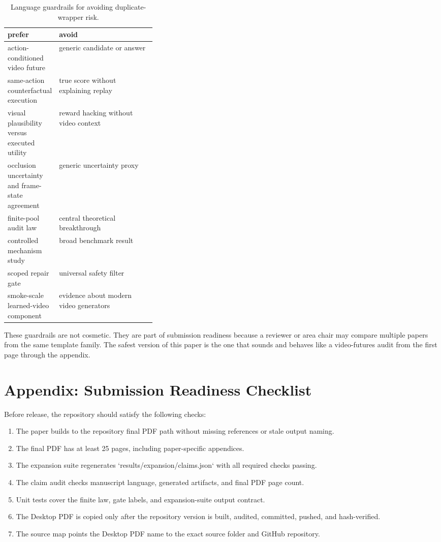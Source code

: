 \documentclass{article}
\begin{document}
\begin{table}[tbp]
  \centering
  \small
  \caption{Language guardrails for avoiding duplicate-wrapper risk.}
  \label{tab:language-guardrails}
  \begin{tabularx}{\linewidth}{@{}p{0.34\linewidth}X@{}}
    \toprule
    prefer & avoid \\
    \midrule
    action-conditioned video future & generic candidate or answer \\
    same-action counterfactual execution & true score without explaining replay \\
    visual plausibility versus executed utility & reward hacking without video context \\
    occlusion uncertainty and frame-state agreement & generic uncertainty proxy \\
    finite-pool audit law & central theoretical breakthrough \\
    controlled mechanism study & broad benchmark result \\
    scoped repair gate & universal safety filter \\
    smoke-scale learned-video component & evidence about modern video generators \\
    \bottomrule
  \end{tabularx}
\end{table}

These guardrails are not cosmetic. They are part of submission readiness because a reviewer or area chair may compare multiple papers from the same template family. The safest version of this paper is the one that sounds and behaves like a video-futures audit from the first page through the appendix.

\section{Appendix: Submission Readiness Checklist}
\label{app:submission-checklist}

Before release, the repository should satisfy the following checks:
\begin{enumerate}
  \item The paper builds to the repository final PDF path without missing references or stale output naming.
  \item The final PDF has at least 25 pages, including paper-specific appendices.
  \item The expansion suite regenerates `results/expansion/claims.json` with all required checks passing.
  \item The claim audit checks manuscript language, generated artifacts, and final PDF page count.
  \item Unit tests cover the finite law, gate labels, and expansion-suite output contract.
  \item The Desktop PDF is copied only after the repository version is built, audited, committed, pushed, and hash-verified.
  \item The source map points the Desktop PDF name to the exact source folder and GitHub repository.
\end{enumerate}
\end{document}
